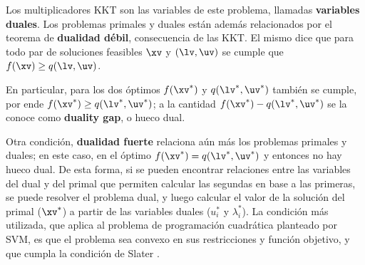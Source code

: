 
Los multiplicadores KKT son las variables de este problema, llamadas \textbf{variables duales}. Los problemas primales y duales están además relacionados por el teorema de \textbf{dualidad débil}, consecuencia de las KKT. El mismo dice que para todo par de soluciones feasibles  $\xv$ y $(\lv,\uv)$ se cumple que $f(\xv) \geq q(\lv,\uv)$.

En particular, para los dos óptimos $f(\xv^*)$ y $q(\lv^*,\uv^*)$ también se cumple, por ende $f(\xv^*) \geq q(\lv^*,\uv^*)$; a la cantidad $f(\xv^*) - q(\lv^*,\uv^*)$ se la conoce como \textbf{duality gap}, o hueco dual.

Otra condición, \textbf{dualidad fuerte} relaciona aún más los problemas primales y duales; en este caso, en el óptimo $f(\xv^*) = q(\lv^*,\uv^*)$ y entonces no hay hueco dual. De esta forma, si se pueden encontrar relaciones entre las variables del dual y del primal que permiten calcular las segundas en base a las primeras, se puede resolver el problema dual, y luego calcular el valor de la solución del primal ($\xv^*$) a partir de las variables duales ($u_i^*$ y $\lambda_i^*$). La condición más utilizada, que aplica al problema de programación cuadrática planteado por SVM, es que el problema sea convexo en sus restricciones y función objetivo, y que cumpla la condición de Slater \cite{boyd2004}.
